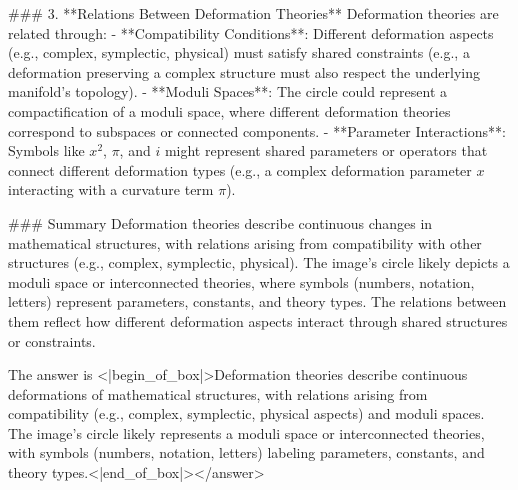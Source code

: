 ### 3. **Relations Between Deformation Theories**  
Deformation theories are related through:  
- **Compatibility Conditions**: Different deformation aspects (e.g., complex, symplectic, physical) must satisfy shared constraints (e.g., a deformation preserving a complex structure must also respect the underlying manifold’s topology).  
- **Moduli Spaces**: The circle could represent a compactification of a moduli space, where different deformation theories correspond to subspaces or connected components.  
- **Parameter Interactions**: Symbols like \(x^2\), \(\pi\), and \(i\) might represent shared parameters or operators that connect different deformation types (e.g., a complex deformation parameter \(x\) interacting with a curvature term \(\pi\)).    

### Summary  
Deformation theories describe continuous changes in mathematical structures, with relations arising from compatibility with other structures (e.g., complex, symplectic, physical). The image’s circle likely depicts a moduli space or interconnected theories, where symbols (numbers, notation, letters) represent parameters, constants, and theory types. The relations between them reflect how different deformation aspects interact through shared structures or constraints.  

The answer is <|begin_of_box|>Deformation theories describe continuous deformations of mathematical structures, with relations arising from compatibility (e.g., complex, symplectic, physical aspects) and moduli spaces. The image’s circle likely represents a moduli space or interconnected theories, with symbols (numbers, notation, letters) labeling parameters, constants, and theory types.<|end_of_box|></answer>
